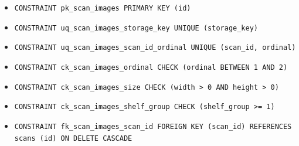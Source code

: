 \begin{itemize}
\item \raggedright {\small\texttt{CONSTRAINT pk\_\allowbreak{}\allowbreak{}scan\_\allowbreak{}\allowbreak{}images PRIMARY KEY (id)}}
\item \raggedright {\small\texttt{CONSTRAINT uq\_\allowbreak{}\allowbreak{}scan\_\allowbreak{}\allowbreak{}images\_\allowbreak{}\allowbreak{}storage\_\allowbreak{}\allowbreak{}key UNIQUE (storage\_\allowbreak{}\allowbreak{}key)}}
\item \raggedright {\small\texttt{CONSTRAINT uq\_\allowbreak{}\allowbreak{}scan\_\allowbreak{}\allowbreak{}images\_\allowbreak{}\allowbreak{}scan\_\allowbreak{}\allowbreak{}id\_\allowbreak{}\allowbreak{}ordinal UNIQUE (scan\_\allowbreak{}\allowbreak{}id, ordinal)}}
\item \raggedright {\small\texttt{CONSTRAINT ck\_\allowbreak{}\allowbreak{}scan\_\allowbreak{}\allowbreak{}images\_\allowbreak{}\allowbreak{}ordinal CHECK (ordinal BETWEEN 1 AND 2)}}
\item \raggedright {\small\texttt{CONSTRAINT ck\_\allowbreak{}\allowbreak{}scan\_\allowbreak{}\allowbreak{}images\_\allowbreak{}\allowbreak{}size CHECK (width > 0 AND height > 0)}}
\item \raggedright {\small\texttt{CONSTRAINT ck\_\allowbreak{}\allowbreak{}scan\_\allowbreak{}\allowbreak{}images\_\allowbreak{}\allowbreak{}shelf\_\allowbreak{}\allowbreak{}group CHECK (shelf\_\allowbreak{}\allowbreak{}group >= 1)}}
\item \raggedright {\small\texttt{CONSTRAINT fk\_\allowbreak{}\allowbreak{}scan\_\allowbreak{}\allowbreak{}images\_\allowbreak{}\allowbreak{}scan\_\allowbreak{}\allowbreak{}id FOREIGN KEY (scan\_\allowbreak{}\allowbreak{}id) REFERENCES scans (id) ON DELETE CASCADE}}
\end{itemize}
